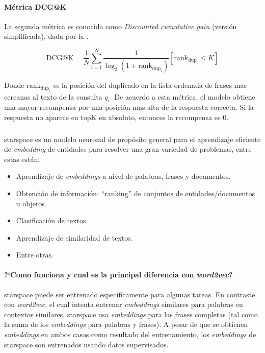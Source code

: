 \paragraph{Métrica DCG@K}
La segunda métrica es conocida como \emph{Discounted cumulative gain} (versión simplificada), dada por la .

\begin{equation} \label{eq:dcg-k}
  \mathrm{DCG@K} = \frac{1}{N} \sum_{i=1}^{N} \frac{1}{\log_2(1+\mathrm{rank}_{\mathrm{dup}_i})} [\mathrm{rank}_{\mathrm{dup}_i} \le K]
\end{equation}

Donde $\mathrm{rank}_{\mathrm{dup}_i}$ es la posición del duplicado en la lista ordenada de frases mas cercanas al texto de la consulta $q_i$. De acuerdo a esta métrica, el modelo obtiene una mayor recompensa por una posición mas alta de la respuesta correcta. Si la respuesta no aparece en $\mathrm{topK}$ en absoluto, entonces la recompensa es $0$.

\subsubsection{}
\gls{starspace} \cite{starspace} es un modelo neuronal de propósito general para el aprendizaje eficiente de \emph{embedding} de entidades para resolver una gran variedad de problemas, entre estas están:
\begin{itemize}
\item Aprendizaje de \emph{embeddings} a nivel de palabras, frases y documentos.
\item Obtención de información: ``ranking'' de conjuntos de entidades/documentos u objetos.
\item Clasificación de textos.
\item Aprendizaje de similaridad de textos.
\item Entre otras.
\end{itemize}

\paragraph{?`Como funciona y cual es la principal diferencia con \emph{word2vec}?}
\gls{starspace} puede ser entrenado específicamente para algunas tareas. En contraste con \emph{word2vec}, el cual intenta entrenar \emph{embeddings} similares para palabras en contextos similares, \gls{starspace} usa \emph{embeddings} para las frases completas (tal como la suma de los \emph{embeddings} para palabras y frases). A pesar de que se obtienen \emph{embeddings} en ambos casos como resultado del entrenamiento, los \emph{embeddings} de \gls{starspace} son entrenados usando datos supervisados.

